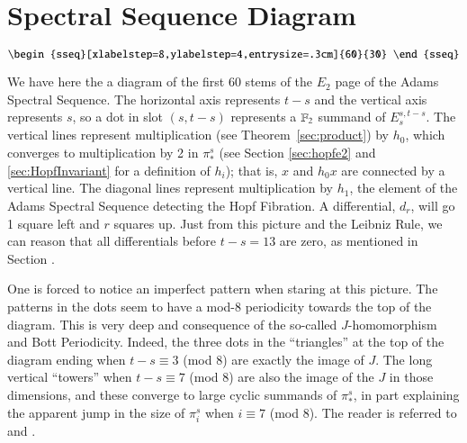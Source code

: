 \section{Spectral Sequence Diagram}
\label{sec:sseq}

\[ \begin{sseq}[xlabelstep=8,ylabelstep=4,entrysize=.3cm]{60}{30}
    
  \end{sseq}
  \]


We have here the a diagram of the first 60 stems of the $E_2$ page of the Adams Spectral Sequence.
The horizontal axis represents $t-s$ and the vertical axis represents $s$, so a dot in slot $(s,t-s)$ represents a $\mathbb{F}_2$ summand of $E_s^{s,t-s}$.  
The vertical lines represent multiplication (see Theorem~\ref{sec:product}) by $h_0$, which converges to multiplication by 2 in $\pi_*^s$ (see Section \ref{sec:hopfe2} and \ref{sec:HopfInvariant} for a definition of $h_i$); that is, $x$ and $h_0x$ are connected by a vertical line.  
The diagonal lines represent multiplication by $h_1$, the element of the Adams Spectral Sequence detecting the Hopf Fibration.  
A differential, $d_r$, will go 1 square left and $r$ squares up.  
Just from this picture and the Leibniz Rule, we can reason that all differentials before $t-s=13$ are zero, as mentioned in Section \label{sec:pairing}.

One is forced to notice an imperfect pattern when staring at this picture.  
The patterns in the dots seem to have a mod-8 periodicity  towards the top of the diagram.
This is very deep and consequence of the so-called $J$-homomorphism and Bott Periodicity.  
Indeed, the three dots in the ``triangles'' at the top of the diagram ending when $t-s\equiv 3$ (mod 8) are exactly the image of $J$.
The long vertical ``towers'' when $t-s\equiv 7$ (mod 8) are also the image of the $J$ in those dimensions, and these converge to large cyclic summands of $\pi_*^s$, in part explaining the apparent jump in the size of $\pi_i^s$ when $i\equiv 7$ (mod 8).  
The reader is referred to \cite{RavenelGreen} and \cite{imJ}.   


